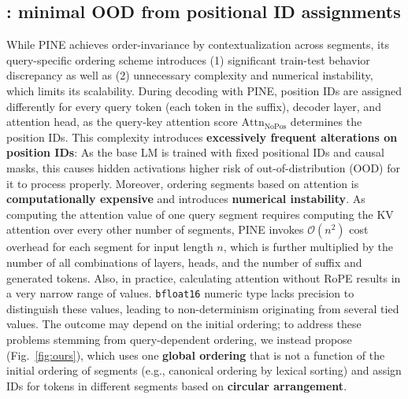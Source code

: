 \subsection{\ours{}: minimal OOD from positional ID assignments}
\label{sec:method_ours}
While PINE achieves order-invariance 
by contextualization across segments, its query-specific ordering scheme introduces (1) significant train-test behavior discrepancy as well as (2) unnecessary complexity and numerical instability, which limits its scalability. During decoding with PINE, position IDs are assigned differently for every query token (each token in the suffix), decoder layer, and attention head, as the query-key attention score $\mathrm{Attn}_{\mathrm{NoPos}}$ determines the position IDs. This complexity introduces \textbf{excessively frequent alterations on position IDs}: As the base LM is trained with fixed positional IDs and causal masks, this causes hidden activations higher risk of out-of-distribution (OOD) for it to process properly. Moreover, ordering segments based on attention is \textbf{computationally expensive} and introduces \textbf{numerical instability}. 
As computing the attention value of one query segment requires computing the KV attention over every other number of segments, PINE invokes $\mathcal{O}(n^2)$ cost overhead for each segment for input length $n$, which is further multiplied by the number of all combinations of layers, heads, and the number of suffix and generated tokens. 
Also, in practice, calculating attention without RoPE results in a very narrow range of values. \texttt{bfloat16} numeric type lacks precision to distinguish these values, leading to non-determinism originating from several tied values. The outcome may depend on the initial ordering; to address these problems stemming from query-dependent ordering, we instead propose \ours{} (Fig.~\ref{fig:ours}), which uses one \textbf{global ordering} that is not a function of the initial ordering of segments (e.g., canonical ordering by lexical sorting) and assign IDs for tokens in different segments based on \textbf{circular arrangement}.

